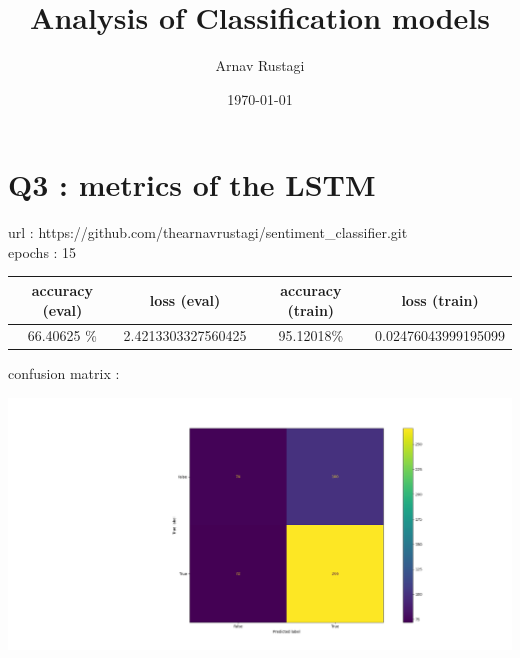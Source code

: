 \documentclass[11pt]{article}
\title{ Analysis of Classification models}
\author{Arnav Rustagi}
\date{\today}
\begin{document}
\maketitle	

\section {Q3 : metrics of the LSTM}
url : https://github.com/thearnavrustagi/sentiment\_classifier.git\\
epochs : 15
\begin{center}
	\begin{tabular}{ |c|c|c|c| } 
 \hline
	accuracy (eval) & loss (eval) & accuracy (train) & loss (train) \\ 
 \hline
	 66.40625 \% & 2.4213303327560425 & 95.12018\% &  0.02476043999195099 \\ 
 \hline
\end{tabular}
\end{center}
confusion matrix :
\begin {center}
	\includegraphics[width=\textwidth]{lstm_cm}
\end {center}
\end{document}
